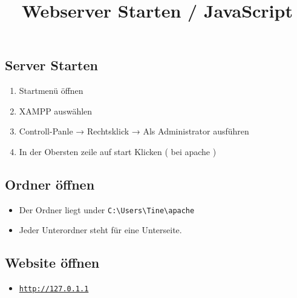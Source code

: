 \documentclass[]{article}
\title{Webserver Starten / JavaScript}
\author{}
\begin{document}
\maketitle

\subsection*{Server Starten}

\begin{enumerate}

	 \item Startmenü öffnen
	 \item XAMPP auswählen
	 \item Controll-Panle → Rechtsklick → Als Administrator ausführen
	 \item In der Obersten zeile auf start Klicken ( bei apache )

\end{enumerate}

\subsection*{Ordner öffnen}
\begin{itemize}
	\item Der Ordner liegt under \texttt{C:\textbackslash Users\textbackslash Tine\textbackslash apache}
	\item Jeder Unterordner steht für eine Unterseite.
\end{itemize}

\subsection*{Website öffnen}
\begin{itemize}
	\item \href{http://127.0.1.1}{\texttt{http://127.0.1.1}}
\end{itemize}
\end{document}
